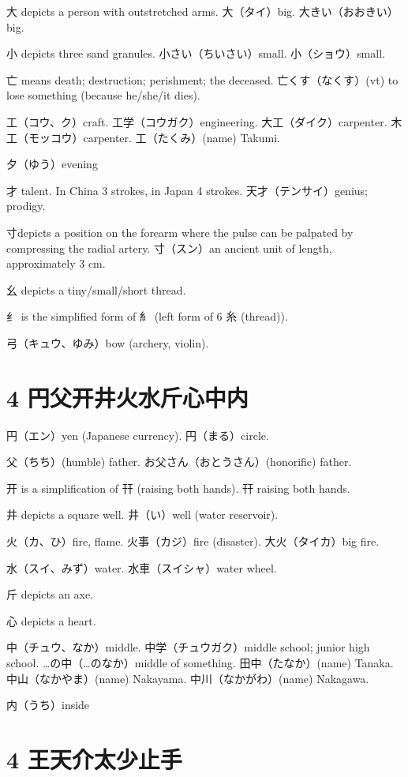 大 depicts a person with outstretched arms.
大（タイ）big.
大きい（おおきい）big.

小 depicts three sand granules.
小さい（ちいさい）small.
小（ショウ）small.

亡 means death; destruction; perishment; the deceased.
亡くす（なくす）(vt) to lose something (because he/she/it dies).

工（コウ、ク）craft.
工学（コウガク）engineering.
大工（ダイク）carpenter.
木工（モッコウ）carpenter.
工（たくみ）(name) Takumi.

夕（ゆう）evening

才 talent.
In China 3 strokes, in Japan 4 strokes.
天才（テンサイ）genius; prodigy.

寸depicts a position on the forearm
where the pulse can be palpated by compressing the radial artery.
寸（スン）an ancient unit of length, approximately 3 cm.

幺 depicts a tiny/small/short thread.

纟 is the simplified form of 糹
(left form of 6 糸 (thread)).

弓（キュウ、ゆみ）bow (archery, violin).

\section{4 円父开井火水斤心中内}

円（エン）yen (Japanese currency).
円（まる）circle.

父（ちち）(humble) father.
お父さん（おとうさん）(honorific) father.

开 is a simplification of 幵 (raising both hands).
幵 raising both hands.

井 depicts a square well.
井（い）well (water reservoir).

火（カ、ひ）fire, flame.
火事（カジ）fire (disaster).
大火（タイカ）big fire.

水（スイ、みず）water.
水車（スイシャ）water wheel.

斤 depicts an axe.

心 depicts a heart.

中（チュウ、なか）middle.
中学（チュウガク）middle school; junior high school.
…の中（…のなか）middle of something.
田中（たなか）(name) Tanaka.
中山（なかやま）(name) Nakayama.
中川（なかがわ）(name) Nakagawa.

内（うち）inside

\section{4 王天介太少止手}

